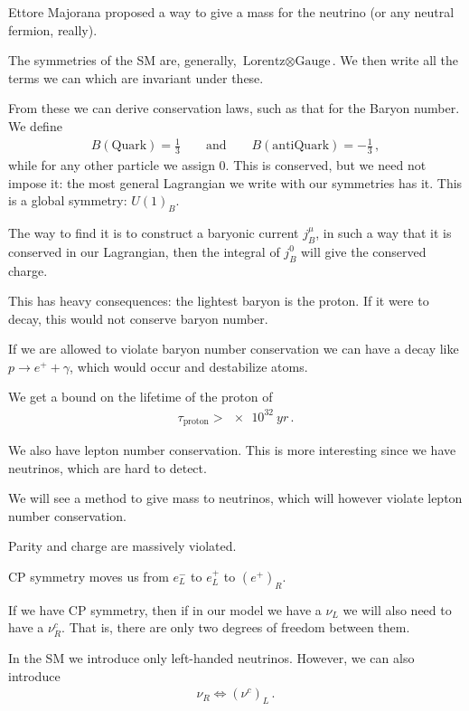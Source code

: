 \documentclass[main.tex]{subfiles}
\begin{document}
Ettore Majorana proposed a way to give a mass for the neutrino (or any neutral fermion, really).

The symmetries of the SM are, generally, \(\text{Lorentz} \otimes \text{Gauge}\).
We then write all the terms we can which are invariant under these. 

From these we can derive conservation laws, such as that for the Baryon number. We define 
%
\begin{align}
B(\text{Quark}) = \frac{1}{3} \qquad \text{and} \qquad
B(\text{antiQuark}) = - \frac{1}{3}
\,,
\end{align}
%
while for any other particle we assign 0.
This is conserved, but we need not impose it: the most general Lagrangian we write with our symmetries has it.
This is a global symmetry: \(U(1)_{B}\). 

The way to find it is to construct a baryonic current \(j^{\mu }_{B}\), in such a way that it is conserved in our Lagrangian, then the integral of \(j^{0}_{B}\) will give the conserved charge.

This has heavy consequences: the lightest baryon is the proton. If it were to decay, this would not conserve baryon number. 

If we are allowed to violate baryon number conservation we can have a decay like \(p \to e^{+ } + \gamma \), which would occur and destabilize atoms.


We get a bound on the lifetime of the proton of 
%
\begin{align}
\tau _{\text{proton}} > \SI{e32}{yr}
\,.
\end{align}

We also have lepton number conservation.
This is more interesting since we have neutrinos, which are hard to detect.

We will see a method to give mass to neutrinos, which will however violate lepton number conservation.

Parity and charge are massively violated.

CP symmetry moves us from \(e^{-}_{L}\) to \(e^{+}_{L}\) to \((e^{+})_{R}\).

If we have CP symmetry, then if in our model we have a \(\nu_{L}\) we will also need to have a \(\nu^{c}_{R}\).
That is, there are only two degrees of freedom between them.

In the SM we introduce only left-handed neutrinos. However, we can also introduce 
%
\begin{align}
\nu_{R} \iff (\nu^{c})_{L}
\,.
\end{align}
\end{document}
